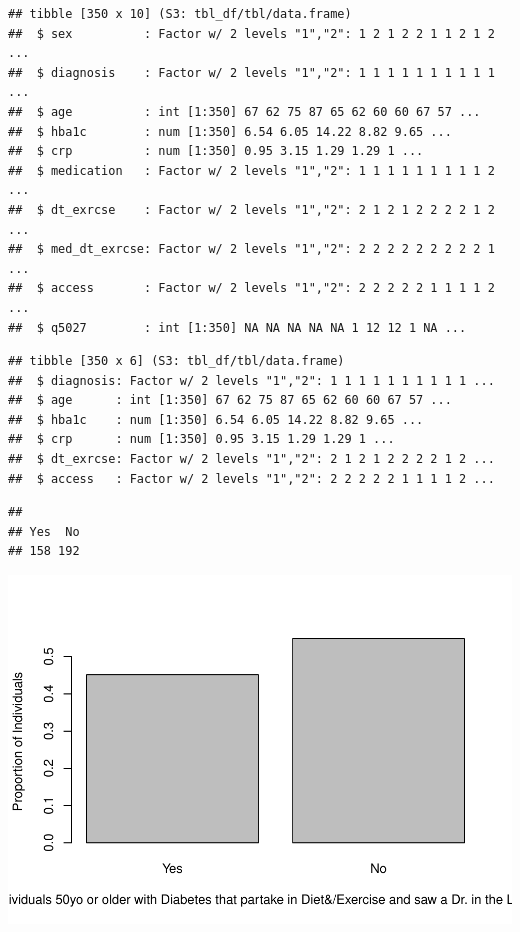 \documentclass[
  man,floatsintext]{apa6}
\begin{document}
\begin{verbatim}
## tibble [350 x 10] (S3: tbl_df/tbl/data.frame)
##  $ sex          : Factor w/ 2 levels "1","2": 1 2 1 2 2 1 1 2 1 2 ...
##  $ diagnosis    : Factor w/ 2 levels "1","2": 1 1 1 1 1 1 1 1 1 1 ...
##  $ age          : int [1:350] 67 62 75 87 65 62 60 60 67 57 ...
##  $ hba1c        : num [1:350] 6.54 6.05 14.22 8.82 9.65 ...
##  $ crp          : num [1:350] 0.95 3.15 1.29 1.29 1 ...
##  $ medication   : Factor w/ 2 levels "1","2": 1 1 1 1 1 1 1 1 1 2 ...
##  $ dt_exrcse    : Factor w/ 2 levels "1","2": 2 1 2 1 2 2 2 2 1 2 ...
##  $ med_dt_exrcse: Factor w/ 2 levels "1","2": 2 2 2 2 2 2 2 2 2 1 ...
##  $ access       : Factor w/ 2 levels "1","2": 2 2 2 2 2 1 1 1 1 2 ...
##  $ q5027        : int [1:350] NA NA NA NA NA 1 12 12 1 NA ...
\end{verbatim}

\begin{verbatim}
## tibble [350 x 6] (S3: tbl_df/tbl/data.frame)
##  $ diagnosis: Factor w/ 2 levels "1","2": 1 1 1 1 1 1 1 1 1 1 ...
##  $ age      : int [1:350] 67 62 75 87 65 62 60 60 67 57 ...
##  $ hba1c    : num [1:350] 6.54 6.05 14.22 8.82 9.65 ...
##  $ crp      : num [1:350] 0.95 3.15 1.29 1.29 1 ...
##  $ dt_exrcse: Factor w/ 2 levels "1","2": 2 1 2 1 2 2 2 2 1 2 ...
##  $ access   : Factor w/ 2 levels "1","2": 2 2 2 2 2 1 1 1 1 2 ...
\end{verbatim}

\begin{verbatim}
## 
## Yes  No 
## 158 192
\end{verbatim}

\includegraphics{NEW_Final_Groupof5_files/figure-latex/RQ3-brittany-1.pdf}
\end{document}
